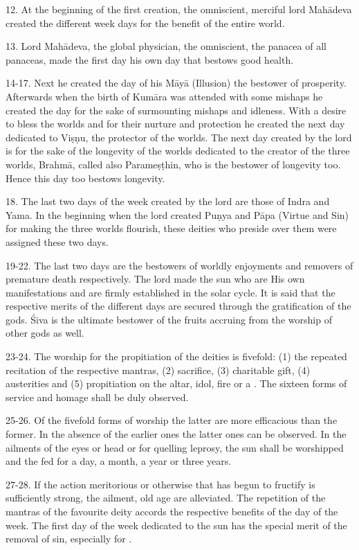 12. At the beginning of the first creation, the omniscient, merciful lord
Mahādeva created the different week days for the benefit of the entire world.

13. Lord Mahādeva, the global physician, the omniscient, the panacea of all
panaceas, made the first day his own day that bestows good health.

14-17. Next he created the day of his Māyā (Illusion) the bestower of
prosperity. Afterwards when the birth of Kumāra was attended with some mishaps
he created the day for the sake of surmounting mishaps and idleness. With
a desire to bless the worlds and for their nurture and protection he created
the next day dedicated to Viṣṇu, the protector of the worlds. The next day
created by the lord is for the sake of the longevity of the worlds dedicated to
the creator of the three worlds, Brahmā, called also Parameṣṭhin, who is
the bestower of longevity too. Hence this day too bestows longevity.

18. The last two days of the week created by the lord are those of Indra and
Yama. In the beginning when the lord created Puṇya and Pāpa (Virtue and Sin) for
making the three worlds flourish, these deities who preside over them were
assigned these two days.

19-22. The last two days are the bestowers of worldly enjoyments and removers of
premature death respectively. The lord made the sun \etc who are His own
manifestations and are firmly established in the solar cycle. It is said that
the respective merits of the different days are secured through
the gratification of the gods. Śiva is the ultimate bestower of the fruits
accruing from the worship of other gods as well.

23-24. The worship for the propitiation of the deities is fivefold:
(1) the repeated recitation of the respective mantras, (2) sacrifice, (3)
charitable gift, (4) austerities and (5) propitiation on the altar, idol, fire
or a . The sixteen forms of service and homage shall be duly
observed.

25-26. Of the fivefold forms of worship the latter are more efficacious than
the former. In the absence of the earlier ones the latter ones can be observed.
In the ailments of the eyes or head or for quelling leprosy, the sun shall be
worshipped and the  fed for a day, a month, a year or three years.

27-28. If the action meritorious or otherwise that has begun to fructify is
sufficiently strong, the ailment, old age \etc are alleviated. The repetition of
the mantras of the favourite deity accords the respective benefits of the day of
the week. The first day of the week dedicated to the sun has the special merit
of the removal of sin, especially for .

